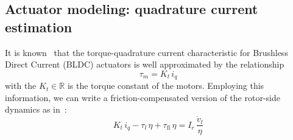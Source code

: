 \subsection{Actuator modeling: quadrature current estimation}
It is known~\cite{foc::krause2013analysis} that the torque-quadrature current characteristic for Brushless Direct Current (BLDC) actuators is well approximated by the relationship
\begin{equation}\label{eq:torque_iq}
\tau_m = K_t\,i_q
\end{equation}
with the $K_t\in\mathbb{R}$ is the torque constant of the motors.
Employing this information, we can write a friction-compensated version of the rotor-side dynamics as in~\cite{friction_comp::le2008friction}:
\begin{equation}\label{eq:rotor_dyn_friction}
    K_t\,i_q  - \tau_l\,\eta + 
\tau_{\mathrm{fl}} \, \eta = I_r\,\dfrac{\dot{v}_l}{\eta}
\end{equation}
